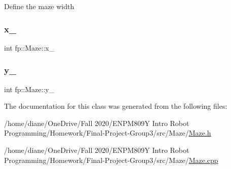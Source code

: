 Define the maze width \mbox{\label{classfp_1_1_maze_ab10af695c3474bccb24aef6737e10558}} 
\subsubsection{\texorpdfstring{x\+\_\+}{x\_}}
{\footnotesize\ttfamily int fp\+::\+Maze\+::x\+\_\+\hspace{0.3cm}{\ttfamily [protected]}}

\mbox{\label{classfp_1_1_maze_a152c4b1c3cf98880b09cd4924c93245b}} 
\subsubsection{\texorpdfstring{y\+\_\+}{y\_}}
{\footnotesize\ttfamily int fp\+::\+Maze\+::y\+\_\+\hspace{0.3cm}{\ttfamily [protected]}}



The documentation for this class was generated from the following files\+:\begin{DoxyCompactItemize}
\item 
/home/diane/\+One\+Drive/\+Fall 2020/\+E\+N\+P\+M809\+Y Intro Robot Programming/\+Homework/\+Final-\/\+Project-\/\+Group3/src/\+Maze/\hyperlink{_maze_8h}{Maze.\+h}\item 
/home/diane/\+One\+Drive/\+Fall 2020/\+E\+N\+P\+M809\+Y Intro Robot Programming/\+Homework/\+Final-\/\+Project-\/\+Group3/src/\+Maze/\hyperlink{_maze_8cpp}{Maze.\+cpp}\end{DoxyCompactItemize}
